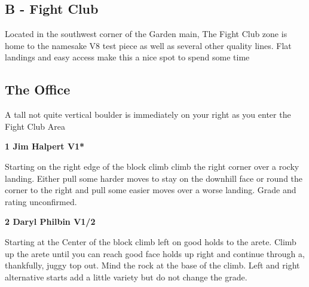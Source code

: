 \begin{multicols}{2}
		\section{B - Fight Club}\label{sa:Fight Club}
	\begin{minipage}{\columnwidth}
	Located in the southwest corner of the Garden main, The Fight Club zone is home to the namesake V8 test piece as well as several other quality lines. Flat landings and easy access make this a nice spot to spend some time
	\end{minipage}
	
			\begin{minipage}{\columnwidth}
			\subsection*{The Office}\label{bf:The Office}
			A tall not quite vertical boulder is immediately on your right as you enter the Fight Club Area
			
			\end{minipage}
			
					\begin{minipage}{\linewidth}	
					\label{rt:Jim Halpert}
\colorbox{green!20}{
\parbox{0.95\textwidth}{
\textbf{
1 Jim Halpert V1*  \warn \warn 
}
}
}

					\begin{adjustwidth}{0.5cm}{}				
					Starting on the right edge of the block climb climb the right corner over a rocky landing. Either pull some harder moves to stay on the downhill face or round the corner to the right and pull some easier moves over a worse landing. Grade and rating unconfirmed.
					\end{adjustwidth}
					\end{minipage}

					\begin{minipage}{\linewidth}	
					\label{rt:Daryl Philbin}
\colorbox{green!20}{
\parbox{0.95\textwidth}{
\textbf{
2 Daryl Philbin V1/2     \warn \warn 
}
}
}

					\begin{adjustwidth}{0.5cm}{}				
					Starting at the Center of the block climb left on good holds to the arete. Climb up the arete until you can reach good face holds up right and continue through a, thankfully, juggy top out. Mind the rock at the base of the climb. Left and right alternative starts add a little variety but do not change the grade.
					\end{adjustwidth}
					\end{minipage}
			\begin{minipage}{\columnwidth}

\end{minipage}
\end{multicols}
